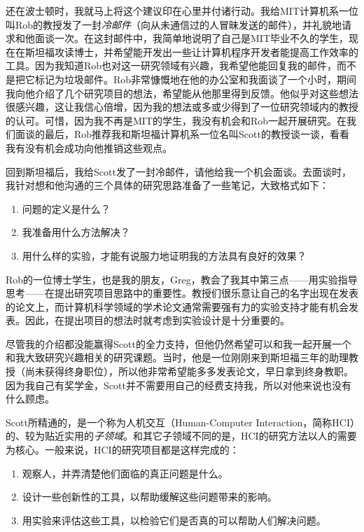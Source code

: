 \documentclass[letter,12pt]{book}
\begin{document}
\begin{CJK}{UTF8}{gbsn}
还在波士顿时，我就马上将这个建议印在心里并付诸行动。我给MIT计算机系一位叫Rob的教授发了一封\emph{冷邮件}（向从未通信过的人冒昧发送的邮件），并礼貌地请求和他面谈一次。在这封邮件中，我简单地说明了自己是MIT毕业不久的学生，现在在斯坦福攻读博士，并希望能开发出一些让计算机程序开发者能提高工作效率的工具。因为我知道Rob也对这一研究领域有兴趣，我希望他能回复我的邮件，而不是把它标记为垃圾邮件。Rob非常慷慨地在他的办公室和我面谈了一个小时，期间我向他介绍了几个研究项目的想法，希望能从他那里得到反馈。他似乎对这些想法很感兴趣，这让我信心倍增，因为我的想法或多或少得到了一位研究领域内的教授的认可。可惜，因为我不再是MIT的学生，我没有机会和Rob一起开展研究。在我们面谈的最后，Rob推荐我和斯坦福计算机系一位名叫Scott的教授谈一谈，看看我有没有机会成功向他推销这些观点。

回到斯坦福后，我给Scott发了一封冷邮件，请他给我一个机会面谈。去面谈时，我针对想和他沟通的三个具体的研究思路准备了一些笔记，大致格式如下：

\begin{enumerate}
\item 问题的定义是什么？
\item 我准备用什么方法解决？
\item 用什么样的实验，才能有说服力地证明我的方法具有良好的效果？
\end{enumerate}

Rob的一位博士学生，也是我的朋友，Greg，教会了我其中第三点——用实验指导思考——在提出研究项目思路中的重要性。教授们很乐意让自己的名字出现在发表的论文上，而计算机科学领域的学术论文通常需要强有力的实验支持才能有机会发表。因此，在提出项目的想法时就考虑到实验设计是十分重要的。

尽管我的介绍都没能赢得Scott的全力支持，但他仍然希望可以和我一起开展一个和我大致研究兴趣相关的研究课题。当时，他是一位刚刚来到斯坦福三年的助理教授（尚未获得终身职位），所以他非常希望能多多发表论文，早日拿到终身教职。因为我自己有奖学金，Scott并不需要用自己的经费支持我，所以对他来说也没有什么顾虑。

\breakline

Scott所精通的，是一个称为人机交互（Human-Computer Interaction，简称HCI）的、较为贴近实用的\emph{子领域}。和其它子领域不同的是，HCI的研究方法以人的需要为核心。一般来说，HCI的研究项目都是这样完成的：

\begin{enumerate}
\item 观察人，并弄清楚他们面临的真正问题是什么。
\item 设计一些创新性的工具，以帮助缓解这些问题带来的影响。
\item 用实验来评估这些工具，以检验它们是否真的可以帮助人们解决问题。
\end{enumerate}


\end{CJK}
\end{document}
